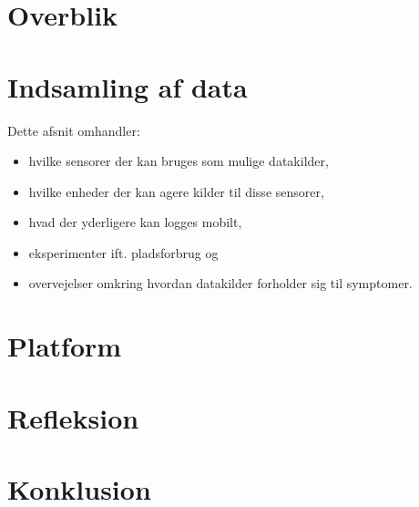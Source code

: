 












\chapter{Overblik}






\chapter{Indsamling af data}
Dette afsnit omhandler:
\begin{itemize}
\item hvilke sensorer der kan bruges som mulige datakilder,
\item hvilke enheder der kan agere kilder til disse sensorer,
\item hvad der yderligere kan logges mobilt,
\item eksperimenter ift. pladsforbrug og
\item overvejelser omkring hvordan datakilder forholder sig til symptomer.
\end{itemize}








\chapter{Platform}\label{platform}






\chapter{Refleksion}\label{sec:refleksion}


\chapter{Konklusion}



